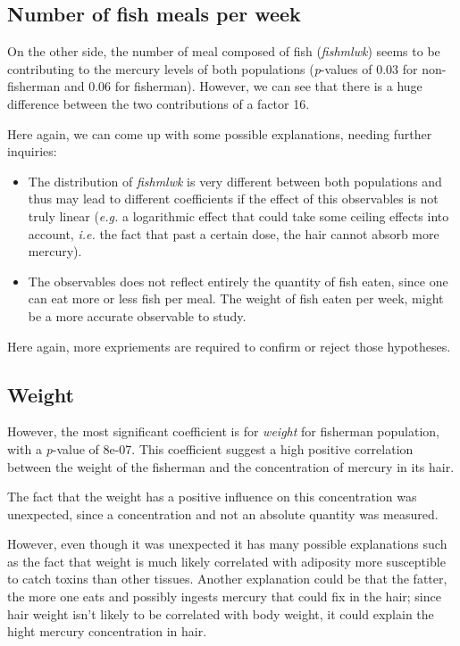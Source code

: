 \documentclass[12pt,]{article}
\begin{document}
\subsection{Number of fish meals per
week}\label{number-of-fish-meals-per-week}

On the other side, the number of meal composed of fish (\emph{fishmlwk})
seems to be contributing to the mercury levels of both populations
(\emph{p}-values of 0.03 for non-fisherman and 0.06 for fisherman).
However, we can see that there is a huge difference between the two
contributions of a factor 16.

Here again, we can come up with some possible explanations, needing
further inquiries:

\begin{itemize}
\item
  The distribution of \emph{fishmlwk} is very different between both
  populations and thus may lead to different coefficients if the effect
  of this observables is not truly linear (\emph{e.g.} a logarithmic
  effect that could take some ceiling effects into account, \emph{i.e.}
  the fact that past a certain dose, the hair cannot absorb more
  mercury).
\item
  The observables does not reflect entirely the quantity of fish eaten,
  since one can eat more or less fish per meal. The weight of fish eaten
  per week, might be a more accurate observable to study.
\end{itemize}

Here again, more expriements are required to confirm or reject those
hypotheses.

\subsection{Weight}\label{weight}

However, the most significant coefficient is for \emph{weight} for
fisherman population, with a \emph{p}-value of 8e-07. This coefficient
suggest a high positive correlation between the weight of the fisherman
and the concentration of mercury in its hair.

The fact that the weight has a positive influence on this concentration
was unexpected, since a concentration and not an absolute quantity was
measured.

However, even though it was unexpected it has many possible explanations
such as the fact that weight is much likely correlated with adiposity
more susceptible to catch toxins than other tissues. Another explanation
could be that the fatter, the more one eats and possibly ingests mercury
that could fix in the hair; since hair weight isn't likely to be
correlated with body weight, it could explain the hight mercury
concentration in hair.
\end{document}
